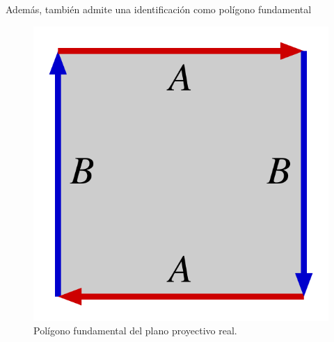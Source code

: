 \begin{exa}
\begin{enumerate}
		Además, también admite una identificación como polígono fundamental
		
		\begin{figure}[h!]
			\centering
			\includegraphics[scale = 0.1]{img/pol_fund_plano_proy}
			\caption{Polígono fundamental del plano proyectivo real.}
		\end{figure}
		

\end{enumerate}
\end{exa}
